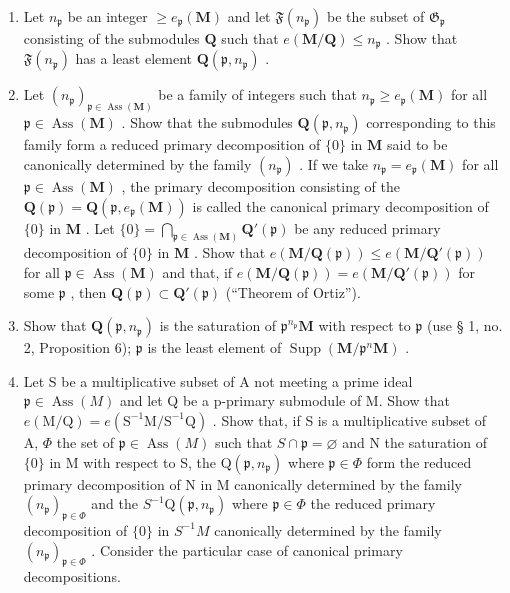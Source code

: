 \begin{enumerate}
\def\labelenumi{(\alph{enumi})}
\item
  Let \(n_{\mathfrak{p}}\) be an integer \(\geqslant e_{\mathfrak{p}}(\mathbf{M})\) and let \(\mathfrak{F}(n_{\mathfrak{p}})\) be the subset of \(\mathfrak{G}_{\mathfrak{p}}\) consisting of the submodules \(\mathbf{Q}\) such that \(e(\mathbf{M} / \mathbf{Q}) \leqslant n_{\mathfrak{p}}\) . Show that \(\mathfrak{F}(n_{\mathfrak{p}})\) has a least element \(\mathbf{Q}(\mathfrak{p}, n_{\mathfrak{p}})\) .
\item
  Let \((n_{\mathfrak{p}})_{\mathfrak{p} \in \operatorname{Ass}(\mathbf{M})}\) be a family of integers such that \(n_{\mathfrak{p}} \geqslant e_{\mathfrak{p}}(\mathbf{M})\) for all \(\mathfrak{p} \in \operatorname{Ass}(\mathbf{M})\) . Show that the submodules \(\mathbf{Q}(\mathfrak{p}, n_{\mathfrak{p}})\) corresponding to this family form a reduced primary decomposition of \(\{0\}\) in \(\mathbf{M}\) said to be canonically determined by the family \((n_{\mathfrak{p}})\) . If we take \(n_{\mathfrak{p}} = e_{\mathfrak{p}}(\mathbf{M})\) for all \(\mathfrak{p} \in \operatorname{Ass}(\mathbf{M})\) , the primary decomposition consisting of the \(\mathbf{Q}(\mathfrak{p}) = \mathbf{Q}(\mathfrak{p}, e_{\mathfrak{p}}(\mathbf{M}))\) is called the canonical primary decomposition of \(\{0\}\) in \(\mathbf{M}\) . Let \(\{0\} = \bigcap_{\mathfrak{p} \in \operatorname{Ass}(\mathbf{M})} \mathbf{Q}'(\mathfrak{p})\) be any reduced primary decomposition of \(\{0\}\) in \(\mathbf{M}\) . Show that \(e(\mathbf{M}/\mathbf{Q}(\mathfrak{p})) \leqslant e(\mathbf{M}/\mathbf{Q}'(\mathfrak{p}))\) for all \(\mathfrak{p} \in \operatorname{Ass}(\mathbf{M})\) and that, if \(e(\mathbf{M}/\mathbf{Q}(\mathfrak{p})) = e(\mathbf{M}/\mathbf{Q}'(\mathfrak{p}))\) for some \(\mathfrak{p}\) , then \(\mathbf{Q}(\mathfrak{p}) \subset \mathbf{Q}'(\mathfrak{p})\) (``Theorem of Ortiz'').
\item
  Show that \(\mathbf{Q}(\mathfrak{p}, n_{\mathfrak{p}})\) is the saturation of \(\mathfrak{p}^{n_{\mathfrak{p}}} \mathbf{M}\) with respect to \(\mathfrak{p}\) (use § 1, no. 2, Proposition 6); \(\mathfrak{p}\) is the least element of \(\operatorname{Supp}(\mathbf{M} / \mathfrak{p}^n\mathbf{M})\) .
\item
  Let S be a multiplicative subset of A not meeting a prime ideal \(\mathfrak{p} \in \operatorname{Ass}(M)\) and let Q be a p-primary submodule of M. Show that \(e(\mathrm{M}/\mathrm{Q}) = e(\mathrm{S}^{-1}\mathrm{M}/\mathrm{S}^{-1}\mathrm{Q})\) . Show that, if S is a multiplicative subset of A, \(\Phi\) the set of \(\mathfrak{p} \in \operatorname{Ass}(M)\) such that \(S \cap \mathfrak{p} = \varnothing\) and N the saturation of \(\{0\}\) in M with respect to S, the \(\mathrm{Q}(\mathfrak{p}, n_{\mathfrak{p}})\) where \(\mathfrak{p} \in \Phi\) form the reduced primary decomposition of N in M canonically determined by the family \((n_{\mathfrak{p}})_{\mathfrak{p} \in \Phi}\) and the \(S^{-1}\mathrm{Q}(\mathfrak{p}, n_{\mathfrak{p}})\) where \(\mathfrak{p} \in \Phi\) the reduced primary decomposition of \(\{0\}\) in \(S^{-1}M\) canonically determined by the family \((n_{\mathfrak{p}})_{\mathfrak{p} \in \Phi}\) . Consider the particular case of canonical primary decompositions.

\end{enumerate}
